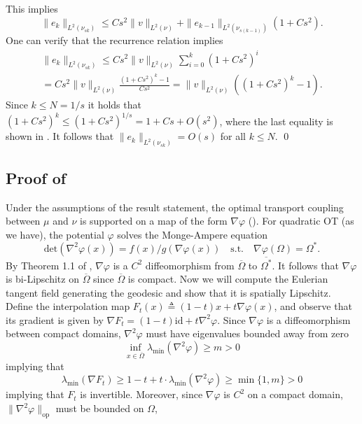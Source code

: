 \documentclass[11pt]{article}
\begin{document}
This implies 
\[\|e_k\|_{L^2(\nu_{sk})} \leq Cs^2\|v\|_{L^2(\nu)} + \|e_{k-1}\|_{L^2(\nu_{s(k-1)})}\left( 1 + Cs^2\right).\]
One can verify that the recurrence relation implies
\begin{multline} \label{eq: error recursion}
\|e_k\|_{L^2(\nu_{sk})} \leq Cs^2\|v\|_{L^2(\nu)}\sum_{i = 0}^k(1 + Cs^2)^i\\ = Cs^2\|v\|_{L^2(\nu)} \frac{(1 + Cs^2)^{k} - 1}{Cs^2} = \|v\|_{L^2(\nu)}\left((1 + Cs^2)^{k} - 1\right).\end{multline}
Since $k \leq N = 1/s$ it holds that $(1 + Cs^2)^k \leq (1 + Cs^2)^{1/s}  = 1 + Cs + O(s^2)$, where the last equality is shown in . It follows that $\|e_k\|_{L^2(\nu_{sk})} = O(s)$
for all $k \leq N$. 
\qed{}



\subsection{Proof of } \label{sec: proof of assumption implications}
Under the assumptions of the result statement, the optimal transport coupling between $\mu$ and $\nu$ is supported on a map of the form $\nabla\varphi$ (). For quadratic OT (as we have), the potential $\varphi$ solves the Monge-Ampere equation 
\[\text{det}(\nabla^2\varphi(x)) = f(x)/g(\nabla \varphi(x)) \quad \text{s.t.} \quad \nabla\varphi(\Omega) = \Omega^*.\]
By Theorem 1.1 of \citet{trudinger2013note}, $\nabla\varphi$ is a $C^2$ diffeomorphism from $\overline{\Omega}$ to $\overline{\Omega^*}$. It follows that $\nabla \varphi$ is bi-Lipschitz on $\overline{\Omega}$ since $\overline{\Omega}$ is compact. Now we will compute the Eulerian tangent field generating the geodesic and show that it is spatially Lipschitz. Define the interpolation map $F_t(x) \triangleq (1-t)x + t\nabla\varphi(x)$, and observe that its gradient is given by $\nabla F_t = (1-t)\text{id} + t\nabla^2 \varphi$.  Since $\nabla\varphi$ is a diffeomorphism between compact domains, $\nabla^2\varphi$ must have eigenvalues bounded away from zero 
\[\inf_{x \in \overline{\Omega}}\lambda_{\min}(\nabla^2\varphi) \geq m > 0\]
implying that 
\begin{equation} \lambda_{\min}(\nabla F_t) \geq 1 - t + t\cdot \lambda_{\min}(\nabla ^2\varphi) \geq \min\{1, m\} > 0 \label{min singular value of flow map jacobian}
\end{equation}
implying that $F_t$ is invertible. Moreover, since $\nabla\varphi$ is $C^2$ on a compact domain, $\|\nabla^2\varphi\|_{\text{op}}$ must be bounded on $\Omega$,
\end{document}
